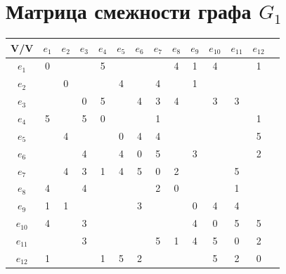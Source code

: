 \documentclass[12pt,a4paper]{report}
\begin{document}
\section*{Матрица смежности графа $G_1$}
\begin{tabular}{|c|c|c|c|c|c|c|c|c|c|c|c|c|c|}
    \hline
    V/V & $e_{1}$ & $e_{2}$ & $e_{3}$ & $e_{4}$ & $e_{5}$ & $e_{6}$ & $e_{7}$ & $e_{8}$ & $e_{9}$ & $e_{10}$ & $e_{11}$ & $e_{12}$ \\
    \hline
    $e_{1}$  & 0 &   &   & 5 &   &   &   & 4 & 1 & 4 &   & 1 \\
    \hline
    $e_{2}$  &   & 0 &   &   & 4 &   & 4 &   & 1 &   &   &   \\
    \hline
    $e_{3}$  &   &   & 0 & 5 &   & 4 & 3 & 4 &   & 3 & 3 &   \\
    \hline
    $e_{4}$  & 5 &   & 5 & 0 &   &   & 1 &   &   &   &   & 1 \\
    \hline
    $e_{5}$  &   & 4 &   &   & 0 & 4 & 4 &   &   &   &   & 5 \\
    \hline
    $e_{6}$  &   &   & 4 &   & 4 & 0 & 5 &   & 3 &   &   & 2 \\
    \hline
    $e_{7}$  &   & 4 & 3 & 1 & 4 & 5 & 0 & 2 &   &   & 5 &   \\
    \hline
    $e_{8}$  & 4 &   & 4 &   &   &   & 2 & 0 &   &   & 1 &   \\
    \hline
    $e_{9}$  & 1 & 1 &   &   &   & 3 &   &   & 0 & 4 & 4 &   \\
    \hline
    $e_{10}$ & 4 &   & 3 &   &   &   &   &   & 4 & 0 & 5 & 5 \\
    \hline
    $e_{11}$ &   &   & 3 &   &   &   & 5 & 1 & 4 & 5 & 0 & 2 \\
    \hline
    $e_{12}$ & 1 &   &   & 1 & 5 & 2 &   &   &   & 5 & 2 & 0 \\
    \hline
\end{tabular}
\end{document}
